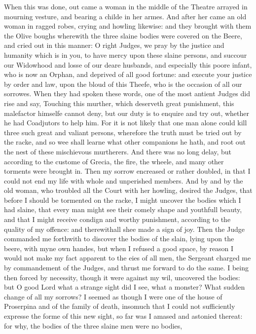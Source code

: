 When this was done, out came a woman in the middle of the Theatre arrayed in
mourning vesture, and bearing a childe in her armes. And after her came an old
woman in ragged robes, crying and howling likewise: and they brought with them
the Olive boughs wherewith the three slaine bodies were covered on the Beere,
and cried out in this manner: O right Judges, we pray by the justice and
humanity which is in you, to have mercy upon these slaine persons, and succour
our Widowhood and losse of our deare husbands, and especially this poore
infant, who is now an Orphan, and deprived of all good fortune: and execute
your justice by order and law, upon the bloud of this Theefe, who is the
occasion of all our sorrowes. When they had spoken these words, one of the most
antient Judges did rise and say, Touching this murther, which deserveth great
punishment, this malefactor himselfe cannot deny, but our duty is to enquire
and try out, whether he had Coadjutors to help him. For it is not likely that
one man alone could kill three such great and valiant persons, wherefore the
truth must be tried out by the racke, and so wee shall learne what other
companions he hath, and root out the nest of these mischievous murtherers. And
there was no long delay, but according to the custome of Grecia, the fire, the
wheele, and many other torments were brought in. Then my sorrow encreased or
rather doubled, in that I could not end my life with whole and unperished
members. And by and by the old woman, who troubled all the Court with her
howling, desired the Judges, that before I should be tormented on the racke, I
might uncover the bodies which I had slaine, that every man might see their
comely shape and youthfull beauty, and that I might receive condign and worthy
punishment, according to the quality of my offence: and therewithall shee made
a sign of joy. Then the Judge commanded me forthwith to discover the bodies of
the slain, lying upon the beere, with myne own handes, but when I refused a
good space, by reason I would not make my fact apparent to the eies of all men,
the Sergeant charged me by commandement of the Judges, and thrust me forward to
do the same. I being then forced by necessity, though it were against my wil,
uncovered the bodies: but O good Lord what a strange sight did I see, what a
monster? What sudden change of all my sorrows? I seemed as though I were one of
the house of Proserpina and of the family of death, insomuch that I could not
sufficiently expresse the forme of this new sight, so far was I amased and
astonied thereat: for why, the bodies of the three slaine men were no bodies,
